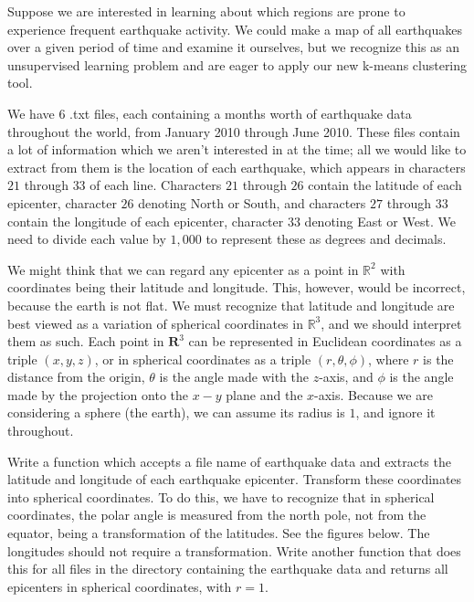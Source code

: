 

Suppose we are interested in learning about which regions are prone to experience frequent earthquake activity. We could make a map of all earthquakes over a given period of time and examine it ourselves, but we recognize this as an unsupervised learning problem and are eager to apply our new k-means clustering tool.

We have 6 .txt files, each containing a months worth of earthquake data throughout the world, from January 2010 through June 2010. These files contain a lot of information which we aren't interested in at the time; all we would like to extract from them is the location of each earthquake, which appears in characters $21$ through $33$ of each line. Characters $21$ through $26$ contain the latitude of each epicenter, character $26$ denoting North or South, and characters $27$ through $33$ contain the longitude of each epicenter, character $33$ denoting East or West. We need to divide each value by $1,000$ to represent these as degrees and decimals.

We might think that we can regard any epicenter as a point in $\mathbb{R}^{2}$ with coordinates being their latitude and longitude. This, however, would be incorrect, because the earth is not flat. We must recognize that latitude and longitude are best viewed as a variation of spherical coordinates in $\mathbb{R}^{3}$, and we should interpret them as such. Each point in $\mathbf{R}^{3}$ can be represented in Euclidean coordinates as a triple $(x,y,z)$, or in spherical coordinates as a triple $(r,\theta,\phi)$, where $r$ is the distance from the origin, $\theta$ is the angle made with the $z$-axis, and $\phi$ is the angle made by the projection onto the $x-y$ plane and the $x$-axis. Because we are considering a sphere (the earth), we can assume its radius is $1$, and ignore it throughout.

\begin{problem}
Write a function which accepts a file name of earthquake data and extracts the latitude and longitude of each earthquake epicenter. Transform these coordinates into spherical coordinates. To do this, we have to recognize that in spherical coordinates, the polar angle is measured from the north pole, not from the equator, being a transformation of the latitudes. See the figures below. The longitudes should not require a transformation. Write another function that does this for all files in the directory containing the earthquake data and returns all epicenters in spherical coordinates, with $r = 1$.
\end{problem}

